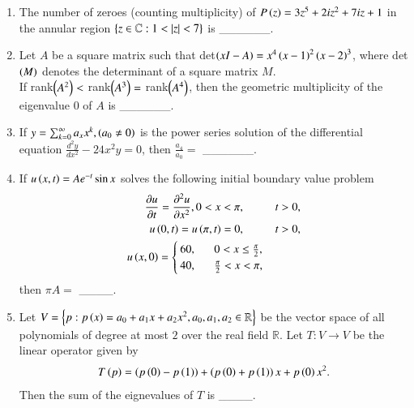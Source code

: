 \documentclass[journal]{IEEEtran}
\begin{document}
\begin{enumerate}
    \item The number of zeroes (counting multiplicity) of $P\left(z\right) = 3z^5 + 2iz^2 + 7iz + 1$ in the annular region $\left\{z \in \mathbb{C} : 1<\left\vert z\right\vert<7\right\}$ is \_\_\_\_\_\_.

    \item Let $A$ be a square matrix such that det$\left(xI - A\right) = x^4\left(x-1\right)^2 \left(x-2\right)^3$, where det$\left(M\right)$ denotes the determinant of a square matrix $M$. \\ If rank$\left(A^2\right) <$ rank$\left(A^3\right)=$ rank$\left(A^4\right)$, then the geometric multiplicity of the eigenvalue $0$ of $A$ is \_\_\_\_\_\_.

    \item If $y = \sum_{k=0}^{\infty} a_x x^k, \left(a_0 \neq 0\right)$ is the power series solution of the differential equation $\frac{d^2y}{dx^2} - 24x^2y = 0$, then $\frac{a_4}{a_0} =$ \_\_\_\_\_\_.

    \item If $u\left(x,t\right) = A e^{-t} \sin x$ solves the following initial boundary value problem
        \begin{align*}
            \frac{\partial u}{\partial t} = \frac{\partial ^2 u}{\partial x^2}, 0<x<\pi,  \hspace{1cm} &t>0,\\
            u\left(0,t\right) = u\left(\pi,t\right) = 0, \hspace{1cm} &t>0,\\
            u\left(x,0\right) = 
                \begin{cases}
                    60,\, \hspace{0.5cm} 0<x \leq \frac{\pi}{2}, \\
                    40,\, \hspace{0.5cm} \frac{\pi}{2} < x < \pi,
                \end{cases}
        \end{align*}
        then $\pi A =$ \_\_\_\_.
        
    \item Let $V = \left\{p : p\left(x\right) = a_0 + a_1 x + a_2 x^2, a_0, a_1, a_2 \in \mathbb{R}\right\}$ be the vector space of all polynomials of degree at most $2$ over the real field $\mathbb{R}$. Let $T:V \rightarrow V$ be the linear operator given by
        \begin{align*}
            T\left(p\right) = \left(p\left(0\right) - p\left(1\right)\right) + \left(p\left(0\right) + p\left(1\right)\right)x + p\left(0\right)x^2.
        \end{align*}
        Then the sum of the eignevalues of $T$ is \_\_\_\_.


\end{enumerate}
\end{document}
